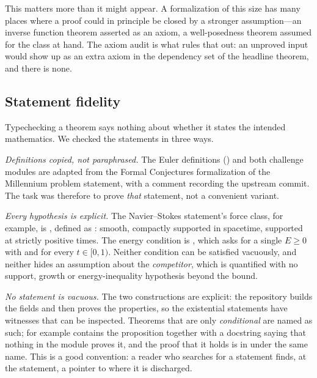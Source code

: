 This matters more than it might appear. A formalization of this size has many places
where a proof could in principle be closed by a stronger assumption---an inverse function
theorem asserted as an axiom, a well-posedness theorem assumed for the class at hand. The
axiom audit is what rules that out: an unproved input would show up as an extra axiom in
the dependency set of the headline theorem, and there is none.

\subsection{Statement fidelity}
\label{sec:fidelity}

Typechecking a theorem says nothing about whether it states the intended mathematics. We
checked the statements in three ways.

\emph{Definitions copied, not paraphrased.} The Euler definitions
() and both challenge modules are adapted from the
Formal Conjectures formalization of the Millennium problem statement, with a comment
recording the upstream commit. The task was therefore to prove \emph{that} statement, not
a convenient variant.

\emph{Every hypothesis is explicit.} The Navier--Stokes statement's force class, for
example, is , defined as
: smooth, compactly supported in
spacetime, supported at strictly positive times. The energy condition is
, which asks for a single $E\ge0$ with
 and  for every $t\in[0,1)$.
Neither condition can be satisfied vacuously, and neither hides an assumption about the
\emph{competitor}, which is quantified with no support, growth or energy-inequality
hypothesis beyond the bound.

\emph{No statement is vacuous.} The two constructions are explicit: the repository builds
the fields and then proves the properties, so the existential statements have witnesses
that can be inspected. Theorems that are only \emph{conditional} are named as such; for
example  contains the proposition
 together with a docstring saying that nothing in the module
proves it, and the proof that it holds is in  under the
same name. This is a good convention: a reader who searches for a statement finds, at the
statement, a pointer to where it is discharged.

